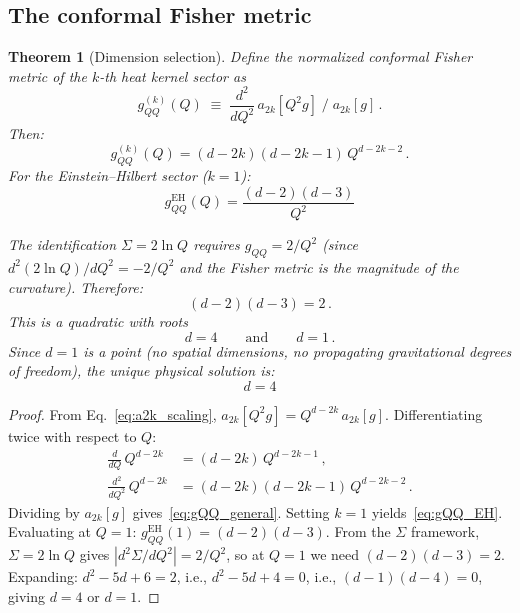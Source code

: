 \documentclass[prd,twocolumn,superscriptaddress,longbibliography]{revtex4-2}
\newtheorem{theorem}{Theorem}
\begin{document}
\subsection{The conformal Fisher metric}

\begin{theorem}[Dimension selection]
\label{thm:d_selection}
Define the \emph{normalized conformal Fisher metric} of
the $k$-th heat kernel sector as
\begin{equation}\label{eq:gQQ_def}
  g_{QQ}^{(k)}(Q)
  \;\equiv\;
  \frac{d^2}{dQ^2}\,a_{2k}[Q^2 g]
  \;\bigg/\; a_{2k}[g]\,.
\end{equation}
Then:
\begin{equation}\label{eq:gQQ_general}
  g_{QQ}^{(k)}(Q)
  = (d-2k)(d-2k-1)\,Q^{d-2k-2}\,.
\end{equation}
For the Einstein--Hilbert sector ($k=1$):
\begin{equation}\label{eq:gQQ_EH}
  \boxed{\;
  g_{QQ}^{\mathrm{EH}}(Q)
  = \frac{(d-2)(d-3)}{Q^2}
  \;}
\end{equation}

The identification $\Sigma = 2\ln Q$ requires
$g_{QQ} = 2/Q^2$ (since
$d^2(2\ln Q)/dQ^2 = -2/Q^2$ and the Fisher metric is
the magnitude of the curvature).
Therefore:
\begin{equation}\label{eq:d_equation}
  (d-2)(d-3) = 2\,.
\end{equation}
This is a quadratic with roots
\begin{equation}
  d = 4
  \qquad\text{and}\qquad
  d = 1\,.
\end{equation}
Since $d=1$ is a point (no spatial dimensions, no
propagating gravitational degrees of freedom), the
unique physical solution is:
\begin{equation}\label{eq:d_equals_4}
  \boxed{\; d = 4 \;}
\end{equation}
\end{theorem}

\begin{proof}
From Eq.~\eqref{eq:a2k_scaling},
$a_{2k}[Q^2g] = Q^{d-2k}\,a_{2k}[g]$.
Differentiating twice with respect to $Q$:
\begin{align}
  \frac{d}{dQ}\,Q^{d-2k}
  &= (d-2k)\,Q^{d-2k-1}\,,\\
  \frac{d^2}{dQ^2}\,Q^{d-2k}
  &= (d-2k)(d-2k-1)\,Q^{d-2k-2}\,.
\end{align}
Dividing by $a_{2k}[g]$
gives~\eqref{eq:gQQ_general}.
Setting $k=1$ yields~\eqref{eq:gQQ_EH}.
Evaluating at $Q=1$:
$g_{QQ}^{\mathrm{EH}}(1) = (d-2)(d-3)$.
From the $\Sigma$ framework, $\Sigma = 2\ln Q$ gives
$|d^2\Sigma/dQ^2| = 2/Q^2$, so at $Q=1$ we need
$(d-2)(d-3)=2$.
Expanding: $d^2 - 5d + 6 = 2$, i.e.,
$d^2-5d+4=0$, i.e., $(d-1)(d-4)=0$, giving
$d=4$ or $d=1$.
\end{proof}
\end{document}
